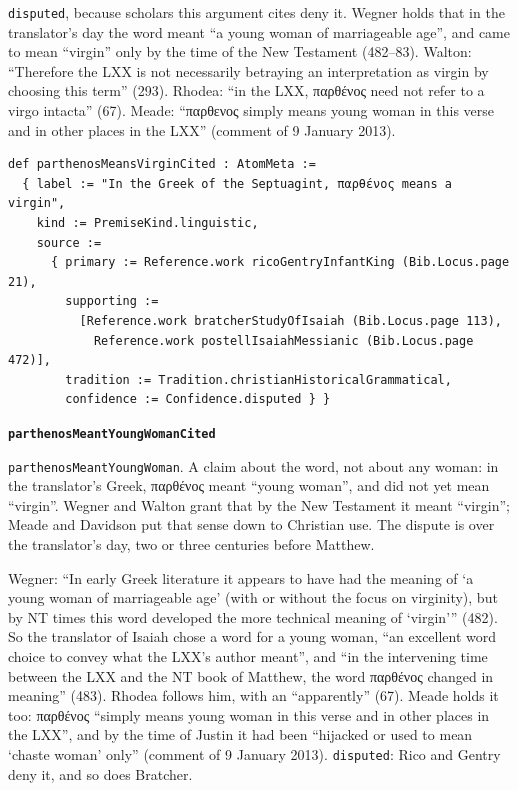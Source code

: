 \documentclass[11pt]{article}
\begin{document}
\texttt{disputed}, because scholars this argument cites deny it. Wegner holds that in the translator’s day the word meant “a young woman of marriageable age”, and came to mean “virgin” only by the time of the New Testament (482–83). Walton: “Therefore the LXX is not necessarily betraying an interpretation as virgin by choosing this term” (293). Rhodea: “in the LXX, παρθένος need not refer to a virgo intacta” (67). Meade: “παρθενος simply means young woman in this verse and in other places in the LXX” (comment of 9 January 2013).

{\small\begin{verbatim}
def parthenosMeansVirginCited : AtomMeta :=
  { label := "In the Greek of the Septuagint, παρθένος means a virgin",
    kind := PremiseKind.linguistic,
    source :=
      { primary := Reference.work ricoGentryInfantKing (Bib.Locus.page 21),
        supporting :=
          [Reference.work bratcherStudyOfIsaiah (Bib.Locus.page 113),
            Reference.work postellIsaiahMessianic (Bib.Locus.page 472)],
        tradition := Tradition.christianHistoricalGrammatical,
        confidence := Confidence.disputed } }
\end{verbatim}}
\par\medskip\noindent\textbf{\texttt{parthenos\allowbreak{}Meant\allowbreak{}Young\allowbreak{}Woman\allowbreak{}Cited}}\par\nobreak\noindent
\texttt{parthenos\allowbreak{}Meant\allowbreak{}Young\allowbreak{}Woman}. A claim about the word, not about any woman: in the translator’s Greek, παρθένος meant “young woman”, and did not yet mean “virgin”. Wegner and Walton grant that by the New Testament it meant “virgin”; Meade and Davidson put that sense down to Christian use. The dispute is over the translator’s day, two or three centuries before Matthew.

Wegner: “In early Greek literature it appears to have had the meaning of ‘a young woman of marriageable age’ (with or without the focus on virginity), but by NT times this word developed the more technical meaning of ‘virgin’” (482). So the translator of Isaiah chose a word for a young woman, “an excellent word choice to convey what the LXX’s author meant”, and “in the intervening time between the LXX and the NT book of Matthew, the word παρθένος changed in meaning” (483). Rhodea follows him, with an “apparently” (67). Meade holds it too: παρθένος “simply means young woman in this verse and in other places in the LXX”, and by the time of Justin it had been “hijacked or used to mean ‘chaste woman’ only” (comment of 9 January 2013). \texttt{disputed}: Rico and Gentry deny it, and so does Bratcher.
\end{document}
